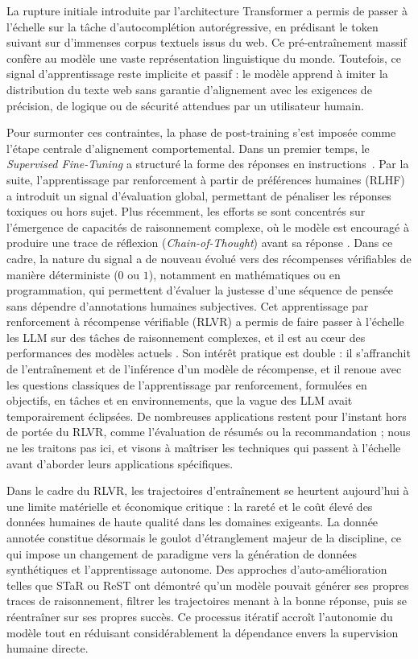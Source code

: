\documentclass[11pt,a4paper]{article}
\begin{document}
La rupture initiale introduite par l'architecture Transformer \cite{vaswani2017attention} a permis de passer à l'échelle sur la tâche d'autocomplétion autorégressive, en prédisant le token suivant sur d'immenses corpus textuels issus du web. Ce pré-entraînement massif confère au modèle une vaste représentation linguistique du monde. Toutefois, ce signal d'apprentissage reste implicite et passif : le modèle apprend à imiter la distribution du texte web sans garantie d'alignement avec les exigences de précision, de logique ou de sécurité attendues par un utilisateur humain.

Pour surmonter ces contraintes, la phase de post-training s'est imposée comme l'étape centrale d'alignement comportemental. Dans un premier temps, le \emph{Supervised Fine-Tuning} a structuré la forme des réponses en instructions~\cite{wei2022flan}. Par la suite, l'apprentissage par renforcement à partir de préférences humaines (RLHF) \cite{ouyang2022training} a introduit un signal d'évaluation global, permettant de pénaliser les réponses toxiques ou hors sujet. Plus récemment, les efforts se sont concentrés sur l'émergence de capacités de raisonnement complexe, où le modèle est encouragé à produire une trace de réflexion (\emph{Chain-of-Thought}) avant sa réponse \cite{wei2022cot}. Dans ce cadre, la nature du signal a de nouveau évolué vers des récompenses vérifiables de manière déterministe ($0$ ou $1$), notamment en mathématiques ou en programmation, qui permettent d'évaluer la justesse d'une séquence de pensée sans dépendre d'annotations humaines subjectives. Cet apprentissage par renforcement à récompense vérifiable (RLVR) a permis de faire passer à l'échelle les LLM sur des tâches de raisonnement complexes, et il est au cœur des performances des modèles actuels \cite{openai_o1_2024, deepseekr1_2025}. Son intérêt pratique est double : il s'affranchit de l'entraînement et de l'inférence d'un modèle de récompense, et il renoue avec les questions classiques de l'apprentissage par renforcement, formulées en objectifs, en tâches et en environnements, que la vague des LLM avait temporairement éclipsées. De nombreuses applications restent pour l'instant hors de portée du RLVR, comme l'évaluation de résumés ou la recommandation ; nous ne les traitons pas ici, et visons à maîtriser les techniques qui passent à l'échelle avant d'aborder leurs applications spécifiques.

Dans le cadre du RLVR, les trajectoires d'entraînement se heurtent aujourd'hui à une limite matérielle et économique critique : la rareté et le coût élevé des données humaines de haute qualité dans les domaines exigeants. La donnée annotée constitue désormais le goulot d'étranglement majeur de la discipline, ce qui impose un changement de paradigme vers la génération de données synthétiques et l'apprentissage autonome. Des approches d'auto-amélioration telles que STaR \cite{zelikman2022star} ou ReST \cite{singh2024beyond} ont démontré qu'un modèle pouvait générer ses propres traces de raisonnement, filtrer les trajectoires menant à la bonne réponse, puis se réentraîner sur ses propres succès. Ce processus itératif accroît l'autonomie du modèle tout en réduisant considérablement la dépendance envers la supervision humaine directe.
\end{document}
